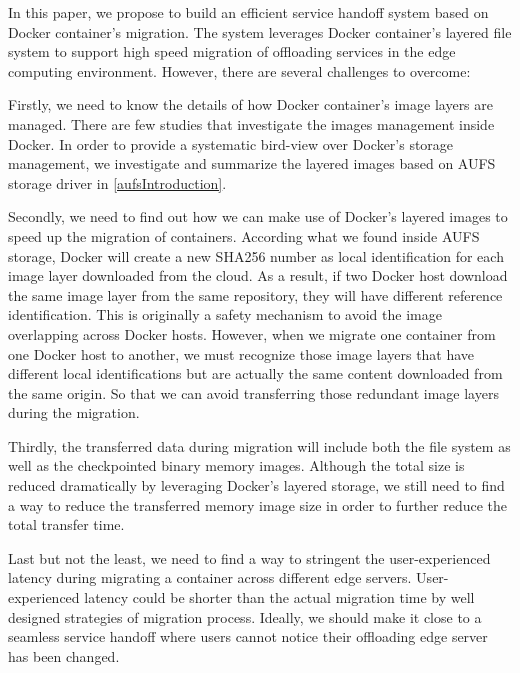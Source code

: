 In this paper, we propose to build an efficient service handoff system based on Docker container's migration. The system leverages Docker container's layered file system to support high speed migration of offloading services in the edge computing environment. 
However, there are several challenges to overcome:

Firstly, we need to know the details of how Docker container's image layers are managed. There are few studies that investigate the images management inside Docker. In order to provide a systematic bird-view over Docker's storage management, we investigate and summarize the layered images based on AUFS storage driver in \ref{aufsIntroduction}.

Secondly, we need to find out how we can make use of Docker's layered images to speed up the migration of containers. According what we found inside AUFS storage, Docker will create a new SHA256 number as local  identification for each image layer downloaded from the cloud. 
As a result, if two Docker host download the same image layer from the same repository, they will have different reference identification. This is originally a safety mechanism to avoid the image overlapping across Docker hosts\cite{dockerlayer}. 
However, when we migrate one container from one Docker host to another, we must recognize those image layers that have different local identifications but are actually the same content downloaded from the same origin. So that we can avoid transferring those redundant image layers during the migration.

Thirdly, the transferred data during migration will include both the file system as well as the checkpointed binary memory images. Although the total size is reduced dramatically by leveraging Docker's layered storage, we still need to find a way to reduce the transferred memory image size in order to further reduce the total transfer time. 

Last but not the least, we need to find a way to stringent the user-experienced latency during migrating a container across different edge servers. User-experienced latency could be shorter than the actual migration time by well designed strategies of migration process. Ideally, we should make it close to a seamless service handoff where users cannot notice their offloading edge server has been changed.

